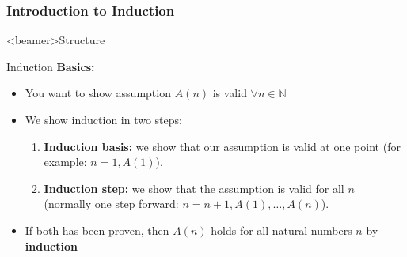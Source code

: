 \subsubsection{Introduction to Induction}

\begin{frame}<beamer>{Structure}
\end{frame}

\begin{frame}{Induction}
  \textbf{Basics:}
  \begin{itemize}
    \item<2- | handout:1>
      You want to show assumption $A(n)$ is valid $\forall n \in \mathbb{N}$
    \item<3- | handout:1>
      We show induction in two steps:
      \begin{enumerate}
        \item<4- | handout:1>
          \textbf{Induction basis:} we show that our assumption is valid 
          at one point (for example: $n = 1, A(1)$).
        \item<5- | handout:1>
          \textbf{Induction step:} we show that the assumption is valid for 
          all $n$ (normally one step forward: $n = n + 1, A(1), \ldots, A(n)$).
      \end{enumerate}
    \item<6- | handout:1>
      If both has been proven, then {\color{MainA}$A(n)$} holds for all natural
      numbers {\color{MainA}$n$} by \textbf{induction}
  \end{itemize}
\end{frame}


